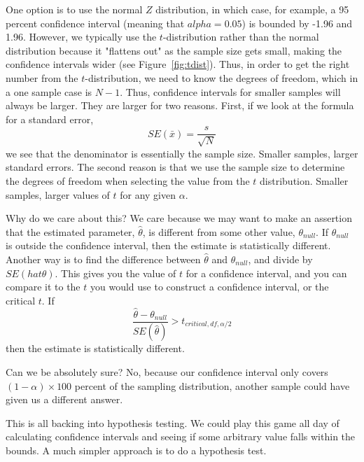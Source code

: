 One option is to use the normal $Z$ distribution, in which case, for example, a 95 percent confidence interval (meaning that $alpha = 0.05$) is bounded by -1.96 and 1.96. However, we typically use the $t$-distribution rather than the normal distribution because it "flattens out" as the sample size gets small, making the confidence intervals wider (see Figure~\ref{fig:tdist}). Thus, in order to get the right number from the $t$-distribution, we need to know the degrees of freedom, which in a one sample case is $N - 1$. Thus, confidence intervals for smaller samples will always be larger. They are larger for two reasons. First, if we look at the formula for a standard error,
\begin{equation}
SE\left(\bar{x}\right) = \frac{s}{\sqrt{N}}
\end{equation}
we see that the denominator is essentially the sample size. Smaller samples, larger standard errors. The second reason is that we use the sample size to determine the degrees of freedom when selecting the value from the $t$ distribution. Smaller samples, larger values of $t$ for any given $\alpha$.

Why do we care about this? We care because we may want to make an assertion that the estimated parameter, $\hat{\theta}$, is different from some other value, $\theta_{null}$. If $\theta_{null}$ is outside the confidence interval, then the estimate is statistically different. Another way is to find the difference between $\hat{\theta}$ and $\theta_{null}$, and divide by $SE\left(hat{\theta}\right)$. This gives you the value of $t$ for a confidence interval, and you can compare it to the $t$ you would use to construct a confidence interval, or the critical $t$. If
\begin{equation}
\frac{\hat{\theta}-\theta_{null}}{SE\left(\hat{\theta}\right)}>t_{critical, df, \alpha/2}
\end{equation}
then the estimate is statistically different.

Can we be absolutely sure? No, because our confidence interval only covers $\left(1-\alpha\right)\times100$ percent of the sampling distribution, another sample could have given us a different answer.

This is all backing into hypothesis testing. We could play this game all day of calculating confidence intervals and seeing if some arbitrary value falls within the bounds. A much simpler approach is to do a hypothesis test.

